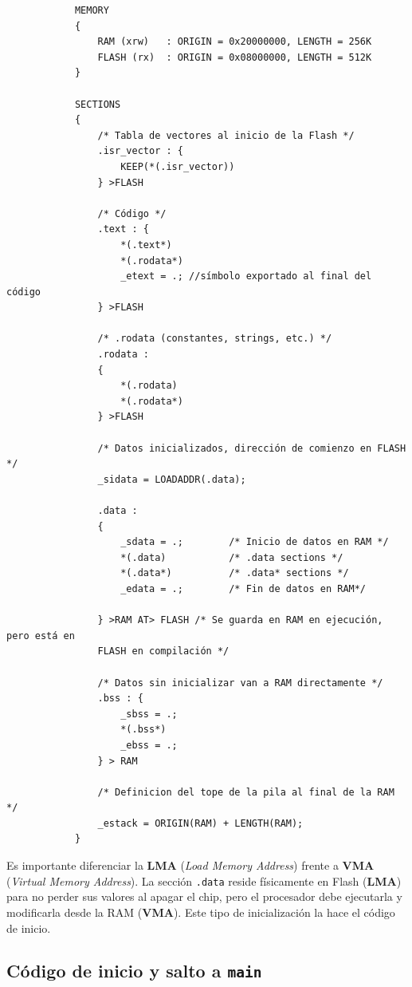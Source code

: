 \documentclass[../main.tex]{subfiles}
\begin{document}
        \begin{lstlisting}
            MEMORY
            {
                RAM (xrw)   : ORIGIN = 0x20000000, LENGTH = 256K
                FLASH (rx)  : ORIGIN = 0x08000000, LENGTH = 512K
            }

            SECTIONS
            {
                /* Tabla de vectores al inicio de la Flash */
                .isr_vector : {
                    KEEP(*(.isr_vector))
                } >FLASH

                /* Código */
                .text : {
                    *(.text*)
                    *(.rodata*)
                    _etext = .; //símbolo exportado al final del código
                } >FLASH

                /* .rodata (constantes, strings, etc.) */
                .rodata :
                {
                    *(.rodata)   
                    *(.rodata*)       
                } >FLASH

                /* Datos inicializados, dirección de comienzo en FLASH */
                _sidata = LOADADDR(.data); 

                .data :
                {
                    _sdata = .;        /* Inicio de datos en RAM */
                    *(.data)           /* .data sections */
                    *(.data*)          /* .data* sections */
                    _edata = .;        /* Fin de datos en RAM*/

                } >RAM AT> FLASH /* Se guarda en RAM en ejecución, pero está en 
                FLASH en compilación */

                /* Datos sin inicializar van a RAM directamente */
                .bss : {
                    _sbss = .;
                    *(.bss*)
                    _ebss = .;
                } > RAM

                /* Definicion del tope de la pila al final de la RAM */
                _estack = ORIGIN(RAM) + LENGTH(RAM);
            }
        \end{lstlisting}

        Es importante diferenciar la \textbf{LMA} (\emph{Load Memory Address}) frente a \textbf{VMA} (\emph{Virtual Memory Address}). La sección \texttt{.data} reside físicamente en Flash (\textbf{LMA}) para no perder sus valores al apagar el chip, pero el procesador debe ejecutarla y modificarla desde la RAM (\textbf{VMA}). Este tipo de inicialización la hace el código de inicio.

    \subsection{Código de inicio y salto a \lstinline|main|}
\end{document}
